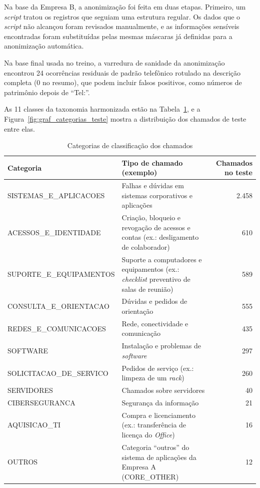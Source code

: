 \documentclass[
    12pt,                %
    openright,           %
    oneside,             %
    a4paper,             %
    english,             %
    brazil               %
]{abntex2}
\let\legendoriginal\legend
\renewcommand{\legend}[1]{\legendoriginal{\small #1}}
\begin{document}
Na base da Empresa B, a anonimização foi feita em duas etapas. Primeiro, um \textit{script} tratou os registros que seguiam uma estrutura regular. Os dados que o \textit{script} não alcançou foram revisados manualmente, e as informações sensíveis encontradas foram substituídas pelas mesmas máscaras já definidas para a anonimização automática.

Na base final usada no treino, a varredura de sanidade da anonimização encontrou 24 ocorrências residuais de padrão telefônico rotulado na descrição completa (0 no resumo), que podem incluir falsos positivos, como números de patrimônio depois de ``Tel:''.

As 11 classes da taxonomia harmonizada estão na Tabela~\ref{tab:categorias}, e a Figura~\ref{fig:graf_categorias_teste} mostra a distribuição dos chamados de teste entre elas.

\begin{table}[htb]
  \centering
  \caption{Categorias de classificação dos chamados}
  \label{tab:categorias}
  \footnotesize
  \setlength{\tabcolsep}{4pt}
  \begin{tabular}{p{5.5cm}p{6.2cm}r}
    \toprule
    Categoria & Tipo de chamado (exemplo) & Chamados no teste \\
    \midrule
    SISTEMAS\_E\_APLICACOES & Falhas e dúvidas em sistemas corporativos e aplicações & 2.458 \\
    ACESSOS\_E\_IDENTIDADE & Criação, bloqueio e revogação de acessos e contas (ex.: desligamento de colaborador) & 610 \\
    SUPORTE\_E\_EQUIPAMENTOS & Suporte a computadores e equipamentos (ex.: \textit{checklist} preventivo de salas de reunião) & 589 \\
    CONSULTA\_E\_ORIENTACAO & Dúvidas e pedidos de orientação & 555 \\
    REDES\_E\_COMUNICACOES & Rede, conectividade e comunicação & 435 \\
    SOFTWARE & Instalação e problemas de \textit{software} & 297 \\
    SOLICITACAO\_DE\_SERVICO & Pedidos de serviço (ex.: limpeza de um \textit{rack}) & 260 \\
    SERVIDORES & Chamados sobre servidores & 40 \\
    CIBERSEGURANCA & Segurança da informação & 21 \\
    AQUISICAO\_TI & Compra e licenciamento (ex.: transferência de licença do \textit{Office}) & 16 \\
    OUTROS & Categoria ``outros'' do sistema de aplicações da Empresa A (CORE\_OTHER) & 12 \\
    \bottomrule
  \end{tabular}
  \legend{Fonte: Elaborado pelos autores.}
\end{table}
\end{document}
